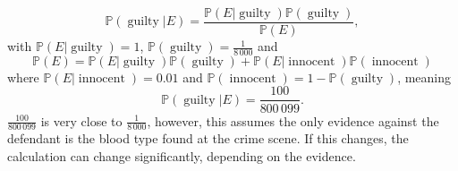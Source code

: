 \begin{example}
\begin{enumerate}
		\begin{equation}
			\mathbb{P}(\operatorname{guilty}|E)=\frac{\mathbb{P}(E|\operatorname{guilty})\mathbb{P}(\operatorname{guilty})}{\mathbb{P}(E)},
		\end{equation}
		with $\mathbb{P}(E|\operatorname{guilty}) = 1$, $\mathbb{P}(\operatorname{guilty})=\frac{1}{8\,000}$ and 
		\begin{equation}
			\mathbb{P}(E) = \mathbb{P}(E|\operatorname{guilty})\mathbb{P}(\operatorname{guilty})+\mathbb{P}(E|\operatorname{innocent})\mathbb{P}(\operatorname{innocent})
		\end{equation}
		where $\mathbb{P}(E|\operatorname{innocent})=0.01$ and $\mathbb{P}(\operatorname{innocent})=1-\mathbb{P}(\operatorname{guilty})$, meaning
		\begin{equation}
			\mathbb{P}(\operatorname{guilty}|E)=\frac{100}{800\,099}.
		\end{equation}
		$\frac{100}{800\,099}$ is very close to $\frac{1}{8\,000}$, however, this assumes the only evidence against the defendant is the blood type found at the crime scene. If this changes, the calculation can change significantly, depending on the evidence.
		
	\end{enumerate}
\end{example}

